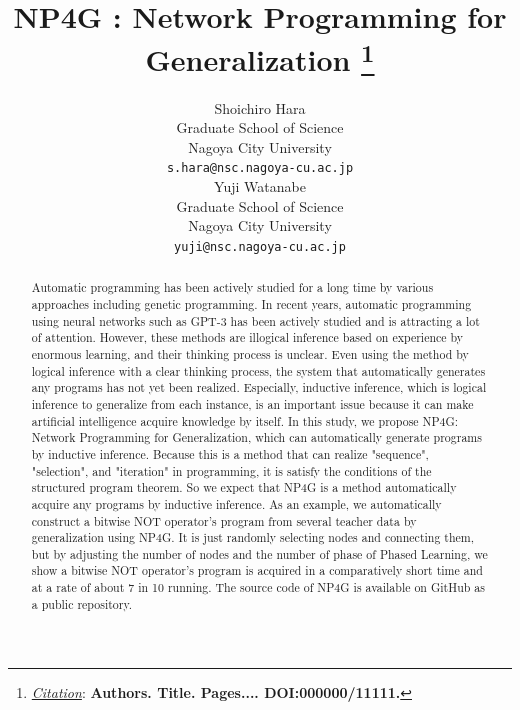 \documentclass{article}
\title{NP4G : Network Programming for Generalization
\thanks{\textit{\underline{Citation}}: 
\textbf{Authors. Title. Pages.... DOI:000000/11111.}} 
}
\author{
  Shoichiro Hara \\
  Graduate School of Science \\
  Nagoya City University \\
  \texttt{s.hara@nsc.nagoya-cu.ac.jp} \\
   \And
  Yuji Watanabe \\
  Graduate School of Science \\
  Nagoya City University \\
  \texttt{yuji@nsc.nagoya-cu.ac.jp} \\
}
\begin{document}
\maketitle


\begin{abstract}
 Automatic programming has been actively studied for a long time by various approaches including genetic programming. In recent years, automatic programming using neural networks such as GPT-3 has been actively studied and is attracting a lot of attention. However, these methods are illogical inference based on experience by enormous learning, and their thinking process is unclear. Even using the method by logical inference with a clear thinking process, the system that automatically generates any programs has not yet been realized. Especially, inductive inference, which is logical inference to generalize from each instance, is an important issue because it can make artificial intelligence acquire knowledge by itself.
 In this study, we propose NP4G: Network Programming for Generalization, which can automatically generate programs by inductive inference. Because this is a method that can realize "sequence", "selection", and "iteration" in programming, it is satisfy the conditions of the structured program theorem. So we expect that NP4G is a method automatically acquire any programs by inductive inference.
 As an example, we automatically construct a bitwise NOT operator's program from several teacher data by generalization using NP4G. It is just randomly selecting nodes and connecting them, but by adjusting the number of nodes and the number of phase of Phased Learning, we show a bitwise NOT operator's program is acquired in a comparatively short time and at a rate of about 7 in 10 running.
 The source code of NP4G is available on GitHub as a public repository\footnotemark[1].
\end{abstract}


\end{document}
